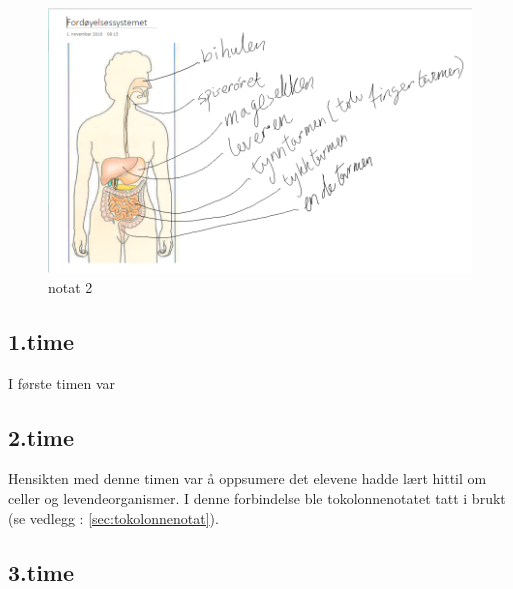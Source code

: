 \documentclass[main.tex]{subfiles}
\begin{document}
\begin{figure}[h!]
\includegraphics[scale = 0.6]{../figures/onenote_fordoyelse.png}
\caption{notat 2}
\label{fig:notat2}
\end{figure}

\subsection*{1.time}

I første timen var

\subsection*{2.time}

Hensikten med denne timen var å oppsumere det elevene hadde lært hittil om celler og levendeorganismer. 
I denne forbindelse ble tokolonnenotatet tatt i brukt (se vedlegg : \ref{sec:tokolonnenotat}).

\subsection*{3.time}
\end{document}
